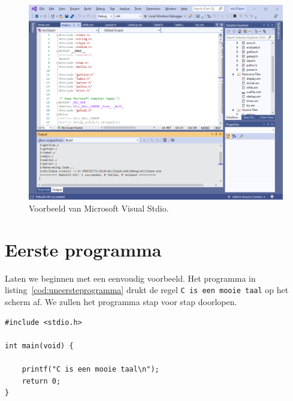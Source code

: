 \begin{figure}[H]
\centering
\includegraphics[scale=\figscale]{images/vs2019}
\caption{Voorbeeld van Microsoft Visual Stdio.}
\label{fig:unvs2019}
\end{figure}

\section{Eerste programma}
Laten we beginnen met een eenvoudig voorbeeld. Het programma in listing~\ref{cod:uneersteprogramma} drukt de regel \texttt{C is een mooie taal} op het scherm af. We zullen het programma stap voor stap doorlopen.

\begin{lstlisting}[caption=Eerste C-programma.,label=cod:uneersteprogramma]
#include <stdio.h>

int main(void) {

	printf("C is een mooie taal\n");
	return 0;
}
\end{lstlisting}

